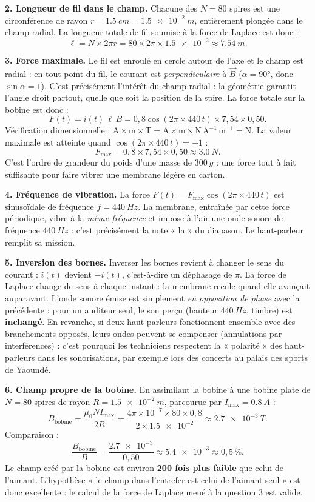 \documentclass[11pt]{article}
\begin{document}
\begin{exoresolu}
\textbf{2. Longueur de fil dans le champ.} Chacune des $N = 80$ spires est une circonférence de rayon $r = \SI{1,5}{cm} = \SI{1,5e-2}{m}$, entièrement plongée dans le champ radial. La longueur totale de fil soumise à la force de Laplace est donc :
\[ \ell = N \times 2\pi r = 80 \times 2\pi \times \num{1,5e-2} \approx \SI{7,54}{m}. \]

\textbf{3. Force maximale.} Le fil est enroulé en cercle autour de l'axe et le champ est radial : en tout point du fil, le courant est \emph{perpendiculaire} à $\vec{B}$ ($\alpha = 90°$, donc $\sin\alpha = 1$). C'est précisément l'intérêt du champ radial : la géométrie garantit l'angle droit partout, quelle que soit la position de la spire. La force totale sur la bobine est donc :
\[ F(t) = i(t)\,\ell\, B = 0{,}8\cos(2\pi \times 440\, t) \times 7{,}54 \times 0{,}50. \]
Vérification dimensionnelle : $\mathrm{A \times m \times T} = \mathrm{A \times m \times N\,A^{-1}\,m^{-1}} = \mathrm{N}$. La valeur maximale est atteinte quand $\cos(2\pi \times 440\, t) = \pm 1$ :
\[ F_{\max} = 0{,}8 \times 7{,}54 \times 0{,}50 \approx \SI{3,0}{N}. \]
C'est l'ordre de grandeur du poids d'une masse de $\SI{300}{g}$ : une force tout à fait suffisante pour faire vibrer une membrane légère en carton.

\textbf{4. Fréquence de vibration.} La force $F(t) = F_{\max}\cos(2\pi \times 440\, t)$ est sinusoïdale de fréquence $f = \SI{440}{Hz}$. La membrane, entraînée par cette force périodique, vibre à la \emph{même fréquence} et impose à l'air une onde sonore de fréquence $\SI{440}{Hz}$ : c'est précisément la note « la » du diapason. Le haut-parleur remplit sa mission.

\textbf{5. Inversion des bornes.} Inverser les bornes revient à changer le sens du courant : $i(t)$ devient $-i(t)$, c'est-à-dire un déphasage de $\pi$. La force de Laplace change de sens à chaque instant : la membrane recule quand elle avançait auparavant. L'onde sonore émise est simplement \emph{en opposition de phase} avec la précédente : pour un auditeur seul, le son perçu (hauteur $\SI{440}{Hz}$, timbre) est \textbf{inchangé}. En revanche, si deux haut-parleurs fonctionnent ensemble avec des branchements opposés, leurs ondes peuvent se compenser (annulations par interférences) : c'est pourquoi les techniciens respectent la « polarité » des haut-parleurs dans les sonorisations, par exemple lors des concerts au palais des sports de Yaoundé.

\textbf{6. Champ propre de la bobine.} En assimilant la bobine à une bobine plate de $N = 80$ spires de rayon $R = \SI{1,5e-2}{m}$, parcourue par $I_{\max} = \SI{0,8}{A}$ :
\[ B_{\text{bobine}} = \dfrac{\mu_0 N I_{\max}}{2R} = \dfrac{4\pi \times 10^{-7} \times 80 \times 0{,}8}{2 \times \num{1,5e-2}} \approx \SI{2,7e-3}{T}. \]
Comparaison :
\[ \dfrac{B_{\text{bobine}}}{B} = \dfrac{\num{2,7e-3}}{0{,}50} \approx \num{5,4e-3} \approx 0{,}5\,\%. \]
Le champ créé par la bobine est environ \textbf{200 fois plus faible} que celui de l'aimant. L'hypothèse « le champ dans l'entrefer est celui de l'aimant seul » est donc excellente : le calcul de la force de Laplace mené à la question 3 est valide.
\end{exoresolu}
\end{document}
